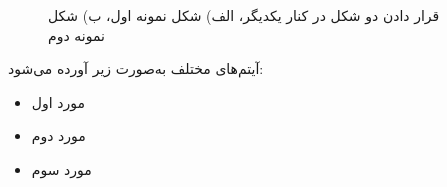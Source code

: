 \begin{figure}[!htb]
\centering
{}
\quad
{}
\caption{
قرار دادن دو شکل در کنار یکدیگر، الف) شکل نمونه اول،
ب) شکل نمونه دوم
}
\label{Fig:SampleFigure2_2}
\end{figure}





آیتم‌های مختلف به‌صورت زیر آورده می‌شود:
\begin{itemize}[label=-]
\item
مورد اول
\item
مورد دوم
\item
مورد سوم
\end{itemize}

